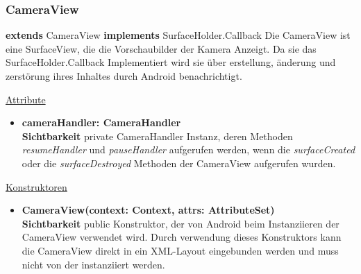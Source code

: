 \subsubsection{CameraView} \label{app:klasse:CameraView}
\textbf{extends} CameraView\newline
\textbf{implements} SurfaceHolder.Callback\newline
Die CameraView ist eine SurfaceView, die die Vorschaubilder der Kamera Anzeigt. Da sie das SurfaceHolder.Callback Implementiert wird sie über erstellung, änderung und zerstörung ihres Inhaltes durch Android benachrichtigt.
\newline

\underline{Attribute}
\begin{itemize}
\itemsep0pt
\item \textbf{cameraHandler: CameraHandler} \hfill\\ 
\textbf{Sichtbarkeit} private \newline
CameraHandler Instanz, deren Methoden \textit{resumeHandler} und \textit{pauseHandler} aufgerufen werden, wenn die \textit{surfaceCreated} oder die \textit{surfaceDestroyed} Methoden der CameraView aufgerufen wurden.

\end{itemize}

\underline{Konstruktoren}
\begin{itemize}
\itemsep0pt
\item \textbf{CameraView(context: Context, attrs: AttributeSet)} \hfill\\
\textbf{Sichtbarkeit} public\newline
Konstruktor, der von Android beim Instanziieren der CameraView verwendet wird. Durch verwendung dieses Konstruktors kann die CameraView direkt in ein XML-Layout eingebunden werden und muss nicht von der  instanziiert werden. 
\end{itemize}

